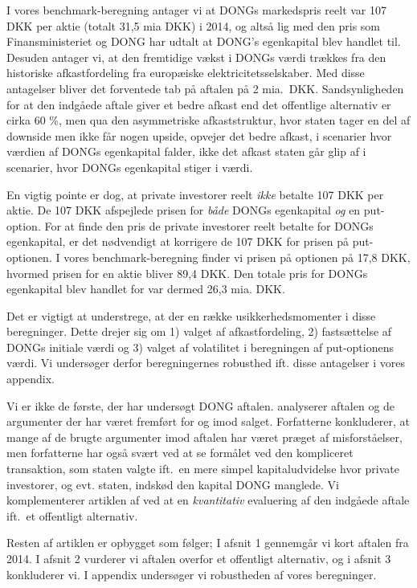 \documentclass{article}
\begin{document}
I vores benchmark-beregning antager vi at DONGs markedspris reelt var 107 DKK per aktie (totalt 31,5 mia DKK) i 2014, og altså lig med den pris som  Finansministeriet og DONG har udtalt at DONG's egenkapital blev handlet til. Desuden antager vi, at den fremtidige vækst i DONGs værdi trækkes fra den historiske afkastfordeling fra europæiske elektricitetsselskaber. Med disse antagelser bliver det forventede tab på aftalen på 2 mia.\ DKK. Sandsynligheden for at den indgåede aftale giver et bedre afkast end det offentlige alternativ er cirka 60 \%, men qua den asymmetriske afkaststruktur, hvor staten tager en del af downside men ikke får nogen upside, opvejer det bedre afkast, i scenarier hvor værdien af DONGs egenkapital falder, ikke det afkast staten går glip af i  scenarier, hvor DONGs egenkapital stiger i værdi.

En vigtig pointe er dog, at private investorer reelt \emph{ikke} betalte 107 DKK per aktie. De 107 DKK afspejlede prisen for \emph{både} DONGs egenkapital \emph{og} en put-option. For at finde den pris de private investorer reelt betalte for DONGs egenkapital, er det nødvendigt at korrigere de 107 DKK for prisen på put-optionen. I vores benchmark-beregning finder vi prisen på optionen på 17,8 DKK, hvormed prisen for en aktie bliver 89,4 DKK. Den totale pris for DONGs egenkapital blev handlet for var dermed 26,3 mia. DKK.

Det er vigtigt at understrege, at der en række usikkerhedsmomenter i disse beregninger. Dette drejer sig om 1) valget af afkastfordeling, 2) fastsættelse af DONGs initiale værdi og 3) valget af volatilitet i beregningen af put-optionens værdi. Vi undersøger derfor beregningernes robusthed ift. disse antagelser i vores appendix.

Vi er ikke de første, der har undersøgt DONG aftalen. \cite{Bachman2014} analyserer aftalen og de argumenter der har været fremført for og imod salget. Forfatterne konkluderer, at mange af de brugte argumenter imod aftalen har været præget af misforståelser, men forfatterne har også svært ved at se formålet ved den kompliceret transaktion, som staten valgte ift.\ en mere simpel kapitaludvidelse hvor private investorer, og evt. staten, indskød den kapital DONG manglede. Vi komplementerer artiklen af \cite{Bachman2014} ved at en \emph{kvantitativ} evaluering af den indgåede aftale ift.\ et offentligt alternativ. %

Resten af artiklen er opbygget som følger; I afsnit 1 gennemgår vi kort aftalen fra 2014. I afsnit 2 vurderer vi aftalen overfor et offentligt alternativ, og i afsnit 3 konkluderer vi. I appendix undersøger vi robustheden af vores beregninger. 
\end{document}
